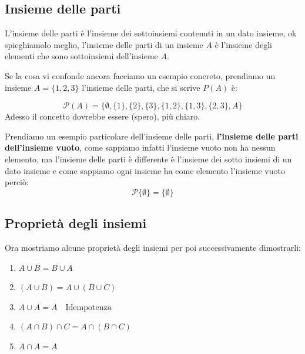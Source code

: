 \documentclass{article}
\theoremstyle{definition}
\begin{document}
\subsection{Insieme delle parti}
L'insieme delle parti è l'insieme dei sottoinsiemi contenuti in un dato insieme, ok spieghiamolo meglio, l'insieme delle parti di un insieme $A$ è l'insieme degli elementi che sono sottoinsiemi dell'insieme $A$. \par
Se la cosa vi confonde ancora facciamo un esempio concreto, prendiamo un insieme $A = \{1,2,3\}$ l'insieme delle parti, che si scrive $P(A)$ è:

\begin{equation}
        \mathcal{P}(A) = \{\emptyset, \{1\}, \{2\}, \{3\}, \{1, 2\}, \{1, 3\}, \{2, 3\}, A \}
\end{equation}
Adesso il concetto dovrebbe essere (spero), più chiaro. \newline 

Prendiamo un esempio particolare dell'insieme delle parti, \textbf{l'insieme delle parti dell'insieme vuoto}, come sappiamo infatti l'insieme vuoto non ha nessun elemento, ma l'insieme delle parti è differente è l'insieme dei sotto insiemi di un dato insieme e come sappiamo ogni insieme ha come elemento l'insieme vuoto perciò:
\begin{equation}
        \mathcal{P}\{\emptyset\} = \{\emptyset  \}
\end{equation}



\subsection{Proprietà degli insiemi}
Ora mostriamo alcune proprietà degli insiemi per poi successivamente dimostrarli:
\begin{enumerate}
        \item $A \cup B = B \cup A$\label{itm:prop1}	
        \item $(A \cup B) = A \cup (B \cup C)$\label{itm:prop_associativa1}
        \item $A \cup A = A \quad \mbox{Idempotenza}$\label{itm:prop3}
        \item $(A \cap B) \cap C = A \cap (B \cap C)$\label{itm:prop_associativa2} 
        \item $A \cap A = A$\label{itm:prop5}
\end{enumerate}
\end{document}
